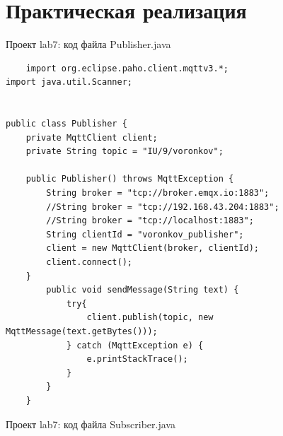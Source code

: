 \documentclass[a4paper, 14pt]{extarticle}
\begin{document}
\section{Практическая реализация}
Проект lab7: код файла Publisher.java
\begin{lstlisting}
    import org.eclipse.paho.client.mqttv3.*;
import java.util.Scanner;


public class Publisher {
    private MqttClient client;
    private String topic = "IU/9/voronkov";

    public Publisher() throws MqttException {
        String broker = "tcp://broker.emqx.io:1883";
        //String broker = "tcp://192.168.43.204:1883";
        //String broker = "tcp://localhost:1883";
        String clientId = "voronkov_publisher";
        client = new MqttClient(broker, clientId);
        client.connect();
    }
        public void sendMessage(String text) {
            try{
                client.publish(topic, new MqttMessage(text.getBytes()));
            } catch (MqttException e) {
                e.printStackTrace();
            }
        }
    }
\end{lstlisting}
\per
Проект lab7: код файла Subscriber.java
\end{document}
